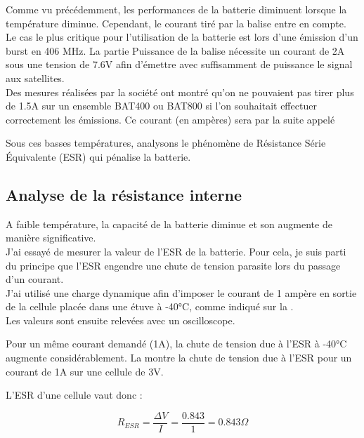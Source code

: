 Comme vu précédemment, les performances de la batterie diminuent lorsque la température diminue. Cependant, le courant tiré par la balise entre en compte. \\

Le cas le plus critique pour l'utilisation de la batterie est lors d'une émission d'un burst en 406 MHz. La partie Puissance de la balise nécessite un courant de 2A sous une tension de 7.6V afin d'émettre avec suffisamment de puissance le signal aux satellites.\\

Des mesures réalisées par la société ont montré qu'on ne pouvaient pas tirer plus de 1.5A sur un ensemble BAT400 ou BAT800 si l'on souhaitait effectuer correctement les émissions.
Ce courant (en ampères) sera par la suite appelé 

Sous ces basses températures, analysons le phénomène de Résistance Série Équivalente (ESR) qui pénalise la batterie.

\subsection{Analyse de la résistance interne}

A faible température, la capacité de la batterie diminue et son  augmente de manière significative. \\

J'ai essayé de mesurer la valeur de l'ESR de la batterie. Pour cela, je suis parti du principe que l'ESR engendre une chute de tension parasite lors du passage d'un courant. \\
J'ai utilisé une charge dynamique afin d'imposer le courant de 1 ampère en sortie de la cellule placée dans une étuve à -40°C, comme indiqué sur la .\\ Les valeurs sont ensuite relevées avec un oscilloscope.


Pour un même courant demandé (1A), la chute de tension due à l'ESR à -40°C augmente considérablement. La  montre la chute de tension due à l'ESR pour un courant de 1A sur une cellule de 3V.


L'ESR d'une cellule vaut donc :

$$ R_{ESR} = \frac{\Delta V}{I} = \frac{0.843}{1} = 0.843 \Omega$$

